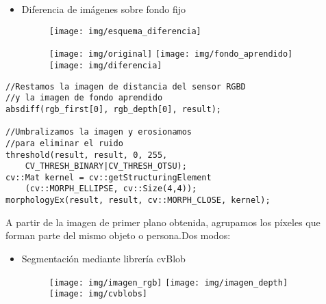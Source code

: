 \documentclass[notes,slidesec,a4]{seminar}
\begin{document}

\begin{hslide}
\begin{itemize}
\item Diferencia de imágenes sobre fondo fijo
\begin{figure}
\begin{center}
	\texttt{[image: img/esquema\_diferencia]}
\end{center}
\end{figure}

\begin{figure}
\begin{center}
	\texttt{[image: img/original]}
	\texttt{[image: img/fondo\_aprendido]}
	\texttt{[image: img/diferencia]}
\end{center}
\end{figure}
\end{itemize}
\end{hslide}


\begin{hslide}\footnotesize
\begin{lstlisting}
//Restamos la imagen de distancia del sensor RGBD
//y la imagen de fondo aprendido
absdiff(rgb_first[0], rgb_depth[0], result);
    
//Umbralizamos la imagen y erosionamos
//para eliminar el ruido
threshold(result, result, 0, 255, 
	CV_THRESH_BINARY|CV_THRESH_OTSU);
cv::Mat kernel = cv::getStructuringElement
	(cv::MORPH_ELLIPSE, cv::Size(4,4));
morphologyEx(result, result, cv::MORPH_CLOSE, kernel);
\end{lstlisting}\normalsize
\end{hslide}


\begin{hslide}
A partir de la imagen de primer plano obtenida, agrupamos los píxeles que forman parte del mismo objeto o persona.Dos modos:
\begin{itemize}
\item Segmentación mediante librería cvBlob
\begin{figure}
\begin{center}
	\texttt{[image: img/imagen\_rgb]}
	\texttt{[image: img/imagen\_depth]}
	\texttt{[image: img/cvblobs]}
\end{center}
\end{figure}
\end{itemize}
\end{hslide}
\end{document}
